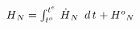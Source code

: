 \documentclass[border=2pt]{standalone}
\begin{document}
${H}{_{N}}=\int_{ {{t^o}}{_{}} }^{ {{t^e}}{_{}} } \, {{\dot{H}}}{_{N}} \enskip d\,{t}{_{}}  + {{H^o}}{_{N}}$
\end{document}
